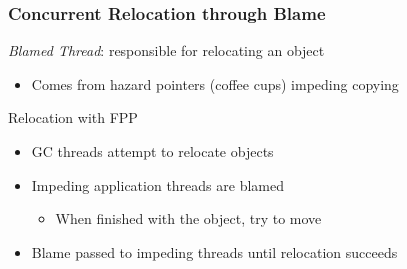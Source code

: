 \documentclass{beamer}
\newcommand{\linespace}{\vskip 0.25cm}
\begin{document}
\begin{frame}

\frametitle{Concurrent Relocation through Blame}


\emph{Blamed Thread}: responsible for relocating an object
\begin{itemize}
\item Comes from hazard pointers (coffee cups) impeding copying
\end{itemize}

\linespace
\linespace

Relocation with FPP
\begin{itemize}
\item GC threads attempt to relocate objects
\item Impeding application threads are blamed
\begin{itemize}
\item When finished with the object, try to move
\end{itemize}
\item Blame passed to impeding threads until relocation succeeds
\end{itemize}

\end{frame}


%
%
%
%
%
\end{document}
